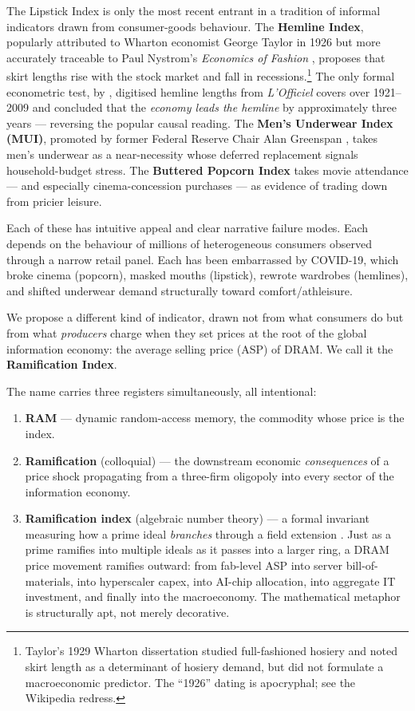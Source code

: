 \documentclass[11pt,a4paper]{article}
\begin{document}
The Lipstick Index is only the most recent entrant in a tradition of informal indicators drawn from consumer-goods behaviour. The \textbf{Hemline Index}, popularly attributed to Wharton economist George Taylor in 1926 but more accurately traceable to Paul Nystrom's \textit{Economics of Fashion} \citep{nystrom1928}, proposes that skirt lengths rise with the stock market and fall in recessions.\footnote{Taylor's 1929 Wharton dissertation \citep{taylor1929} studied full-fashioned hosiery and noted skirt length as a determinant of hosiery demand, but did not formulate a macroeconomic predictor. The ``1926'' dating is apocryphal; see the Wikipedia redress.} The only formal econometric test, by \citet{baardwijk2010}, digitised hemline lengths from \textit{L'Officiel} covers over 1921--2009 and concluded that the \emph{economy leads the hemline} by approximately three years --- reversing the popular causal reading. The \textbf{Men's Underwear Index (MUI)}, promoted by former Federal Reserve Chair Alan Greenspan \citep{greenspan2007,krulwich2008}, takes men's underwear as a near-necessity whose deferred replacement signals household-budget stress. The \textbf{Buttered Popcorn Index} takes movie attendance --- and especially cinema-concession purchases --- as evidence of trading down from pricier leisure.

Each of these has intuitive appeal and clear narrative failure modes. Each depends on the behaviour of millions of heterogeneous consumers observed through a narrow retail panel. Each has been embarrassed by COVID-19, which broke cinema (popcorn), masked mouths (lipstick), rewrote wardrobes (hemlines), and shifted underwear demand structurally toward comfort/athleisure.

We propose a different kind of indicator, drawn not from what consumers do but from what \emph{producers} charge when they set prices at the root of the global information economy: the average selling price (ASP) of DRAM. We call it the \textbf{Ramification Index}.

The name carries three registers simultaneously, all intentional:

\begin{enumerate}
  \item \textbf{RAM} --- dynamic random-access memory, the commodity whose price is the index.
  \item \textbf{Ramification} (colloquial) --- the downstream economic \emph{consequences} of a price shock propagating from a three-firm oligopoly into every sector of the information economy.
  \item \textbf{Ramification index} (algebraic number theory) --- a formal invariant measuring how a prime ideal \emph{branches} through a field extension \citep{neukirch1999}. Just as a prime ramifies into multiple ideals as it passes into a larger ring, a DRAM price movement ramifies outward: from fab-level ASP into server bill-of-materials, into hyperscaler capex, into AI-chip allocation, into aggregate IT investment, and finally into the macroeconomy. The mathematical metaphor is structurally apt, not merely decorative.
\end{enumerate}
\end{document}
